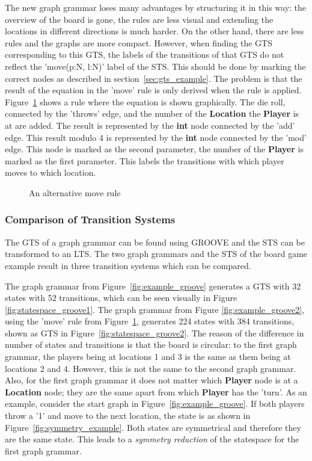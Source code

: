 The new graph grammar loses many advantages by structuring it in this way: the overview of the board is gone, the rules are less visual and extending the locations in different directions is much harder. On the other hand, there are less rules and the graphs are more compact. However, when finding the GTS corresponding to this GTS, the labels of the transitions of that GTS do not reflect the 'move(p:N, l:N)' label of the STS. This should be done by marking the correct nodes as described in section~\ref{sec:gts_example}. The problem is that the result of the equation in the 'move' rule is only derived when the rule is applied. Figure~\ref{fig:move3} shows a rule where the equation is shown graphically. The die roll, connected by the 'throws' edge, and the number of the \textbf{Location} the \textbf{Player} is at are added. The result is represented by the \textbf{int} node connected by the 'add' edge. This result modulo 4 is represented by the \textbf{int} node connected by the 'mod' edge. This node is marked as the second parameter, the number of the \textbf{Player} is marked as the first parameter. This labels the transitions with which player moves to which location.

\begin{figure}[h]
  \begin{center}
    
  \end{center}
  \caption{An alternative move rule}
  \label{fig:move3}
\end{figure}

\subsubsection{Comparison of Transition Systems}
The GTS of a graph grammar can be found using GROOVE and the STS can be transformed to an LTS. The two graph grammars and the STS of the board game example result in three transition systems which can be compared.

The graph grammar from Figure~\ref{fig:example_groove} generates a GTS with 32 states with 52 transitions, which can be seen visually in Figure~ \ref{fig:statespace_groove1}. The graph grammar from Figure \ref{fig:example_groove2}, using the 'move' rule from Figure~\ref{fig:move3}, generates 224 states with 384 transitions, shown as GTS in Figure~\ref{fig:statespace_groove2}. The reason of the difference in number of states and transitions is that the board is circular: to the first graph grammar, the players being at locations 1 and 3 is the same as them being at locations 2 and 4. However, this is not the same to the second graph grammar. Also, for the first graph grammar it does not matter which \textbf{Player} node is at a \textbf{Location} node; they are the same apart from which \textbf{Player} has the 'turn'. As an example, consider the start graph in Figure~\ref{fig:example_groove}. If both players throw a '1' and move to the next location, the state is as shown in Figure~\ref{fig:symmetry_example}. Both states are symmetrical and therefore they are the same state. This leads to a \textit{symmetry reduction} of the statespace for the first graph grammar.

